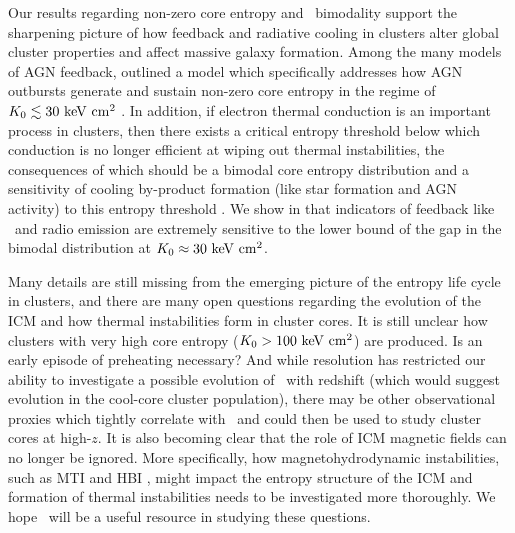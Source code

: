 \documentclass[12pt,preprint]{aastex}
\begin{document}
Our results regarding non-zero core entropy and \kna\ bimodality
support the sharpening picture of how feedback and radiative cooling
in clusters alter global cluster properties and affect massive galaxy
formation. Among the many models of AGN feedback, \citet{agnframework}
outlined a model which specifically addresses how AGN outbursts
generate and sustain non-zero core entropy in the regime of $K_0 \lesssim
30 \mathrm{\mbox{\ensuremath{\mathrm{~keV}}} \mathrm{\mbox{\ensuremath{\mathrm{~cm}}}^2}}$ \citep[see also][]{kaiser03}. In addition, if electron
thermal conduction is an important process in clusters, then there
exists a critical entropy threshold below which conduction is no
longer efficient at wiping out thermal instabilities, the consequences
of which should be a bimodal core entropy distribution and a
sensitivity of cooling by-product formation (like star formation and
AGN activity) to this entropy threshold \citep{conduction,
  2008arXiv0804.3823G}. We show in \citet{haradent} that indicators of
feedback like \halpha\ and radio emission are extremely sensitive to
the lower bound of the gap in the bimodal distribution at $K_0
\approx 30 \mathrm{\mbox{\ensuremath{\mathrm{~keV}}} \mathrm{\mbox{\ensuremath{\mathrm{~cm}}}^2}}$.

Many details are still missing from the emerging picture of the
entropy life cycle in clusters, and there are many open questions
regarding the evolution of the ICM and how thermal instabilities form
in cluster cores. It is still unclear how clusters with very high core
entropy ($K_0 > 100 \mathrm{\mbox{\ensuremath{\mathrm{~keV}}} \mathrm{\mbox{\ensuremath{\mathrm{~cm}}}^2}}$) are produced. Is an early episode of
preheating necessary? And while resolution has restricted our ability
to investigate a possible evolution of \kna\ with redshift (which
would suggest evolution in the cool-core cluster population), there
may be other observational proxies which tightly correlate with
\kna\ and could then be used to study cluster cores at high-$z$. It is
also becoming clear that the role of ICM magnetic fields can no longer
be ignored. More specifically, how magnetohydrodynamic instabilities,
such as MTI \citep{2000ApJ...534..420B, 2008ApJ...673..758Q} and HBI
\citep{2008ApJ...677L...9P}, might impact the entropy structure of the
ICM and formation of thermal instabilities needs to be investigated
more thoroughly. We hope \accept\ will be a useful resource in
studying these questions.

\acknowledgements
\end{document}
